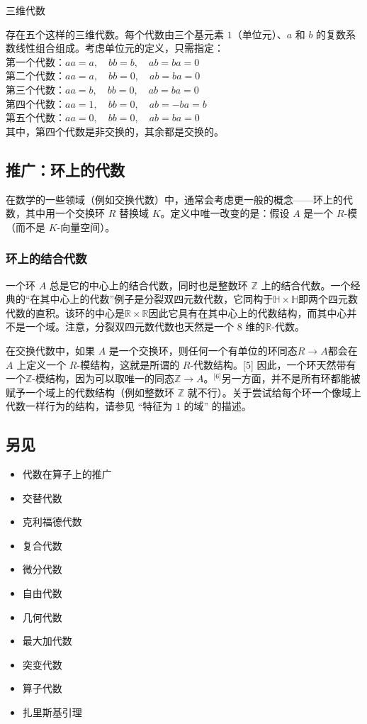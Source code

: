 三维代数

存在五个这样的三维代数。每个代数由三个基元素 $1$（单位元）、$a$ 和 $b$ 的复数系数线性组合组成。考虑单位元的定义，只需指定：\\
第一个代数：$a a = a, \quad b b = b, \quad a b = b a = 0$\\
第二个代数：$a a = a, \quad b b = 0, \quad a b = b a = 0$\\
第三个代数：$a a = b, \quad b b = 0, \quad a b = b a = 0$\\
第四个代数：$a a = 1, \quad b b = 0, \quad a b = - b a = b$\\
第五个代数：$a a = 0, \quad b b = 0, \quad a b = b a = 0$\\
其中，第四个代数是非交换的，其余都是交换的。
\subsection{推广：环上的代数}

在数学的一些领域（例如交换代数）中，通常会考虑更一般的概念——环上的代数，其中用一个交换环 $R$ 替换域 $K$。定义中唯一改变的是：假设 $A$ 是一个 $R$-模（而不是 $K$-向量空间）。
\subsubsection{环上的结合代数}
一个环 $A$ 总是它的中心上的结合代数，同时也是整数环 $\mathbb{Z}$ 上的结合代数。一个经典的“在其中心上的代数”例子是分裂双四元数代数，它同构于$\mathbb{H} \times \mathbb{H}$即两个四元数代数的直积。该环的中心是$\mathbb{R} \times \mathbb{R}$因此它具有在其中心上的代数结构，而其中心并不是一个域。注意，分裂双四元数代数也天然是一个 8 维的$\mathbb{R}$-代数。

在交换代数中，如果 $A$ 是一个交换环，则任何一个有单位的环同态$R \to A$都会在 $A$ 上定义一个 $R$-模结构，这就是所谓的 $R$-代数结构。[5] 因此，一个环天然带有一个$\mathbb{Z}$-模结构，因为可以取唯一的同态$\mathbb{Z} \to A$。\(^\text{[6]}\)另一方面，并不是所有环都能被赋予一个域上的代数结构（例如整数环 \(\mathbb{Z}\) 就不行）。关于尝试给每个环一个像域上代数一样行为的结构，请参见 “特征为 1 的域” 的描述。
\subsection{另见}
\begin{itemize}
\item 代数在算子上的推广
\item 交替代数
\item 克利福德代数
\item 复合代数
\item 微分代数
\item 自由代数
\item 几何代数
\item 最大加代数
\item 突变代数
\item 算子代数
\item 扎里斯基引理
\end{itemize}
